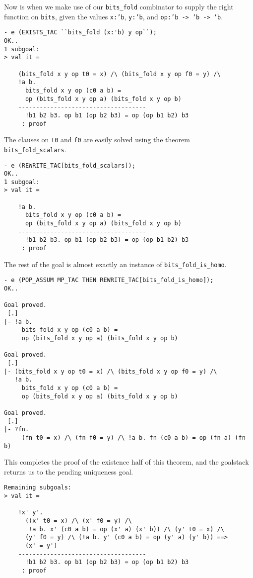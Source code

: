 Now is when we make use of our \texttt{bits\_fold} combinator to supply
the right function on \texttt{bits}, given the values \texttt{x:'b},
\texttt{y:'b}, and \texttt{op:'b~->~'b~->~'b}.
%
\begin{session}
\begin{verbatim}
- e (EXISTS_TAC ``bits_fold (x:'b) y op``);
OK..
1 subgoal:
> val it =
    
    (bits_fold x y op t0 = x) /\ (bits_fold x y op f0 = y) /\
    !a b.
      bits_fold x y op (c0 a b) =
      op (bits_fold x y op a) (bits_fold x y op b)
    ------------------------------------
      !b1 b2 b3. op b1 (op b2 b3) = op (op b1 b2) b3
     : proof
\end{verbatim}
\end{session}

The clauses on \texttt{t0} and \texttt{f0} are easily
solved
using the theorem \texttt{bits\_fold\_scalars}.
%
\begin{session}
\begin{verbatim}
- e (REWRITE_TAC[bits_fold_scalars]);
OK..
1 subgoal:
> val it =
    
    !a b.
      bits_fold x y op (c0 a b) =
      op (bits_fold x y op a) (bits_fold x y op b)
    ------------------------------------
      !b1 b2 b3. op b1 (op b2 b3) = op (op b1 b2) b3
     : proof
\end{verbatim}
\end{session}

The rest of the goal is almost exactly an instance of
\texttt{bits\_fold\_is\_homo}.
%
\begin{session}
\begin{verbatim}
- e (POP_ASSUM MP_TAC THEN REWRITE_TAC[bits_fold_is_homo]);
OK..

Goal proved.
 [.]
|- !a b.
     bits_fold x y op (c0 a b) =
     op (bits_fold x y op a) (bits_fold x y op b)

Goal proved.
 [.]
|- (bits_fold x y op t0 = x) /\ (bits_fold x y op f0 = y) /\
   !a b.
     bits_fold x y op (c0 a b) =
     op (bits_fold x y op a) (bits_fold x y op b)

Goal proved.
 [.]
|- ?fn.
     (fn t0 = x) /\ (fn f0 = y) /\ !a b. fn (c0 a b) = op (fn a) (fn b)
\end{verbatim}
\end{session}

This completes the proof of the existence half of this theorem, and the
\HOLW{} goalstack returns us to the pending uniqueness goal.
\begin{session}
\begin{verbatim}
Remaining subgoals:
> val it =
    
    !x' y'.
      ((x' t0 = x) /\ (x' f0 = y) /\
       !a b. x' (c0 a b) = op (x' a) (x' b)) /\ (y' t0 = x) /\
      (y' f0 = y) /\ (!a b. y' (c0 a b) = op (y' a) (y' b)) ==>
      (x' = y')
    ------------------------------------
      !b1 b2 b3. op b1 (op b2 b3) = op (op b1 b2) b3
     : proof
\end{verbatim}
\end{session}

